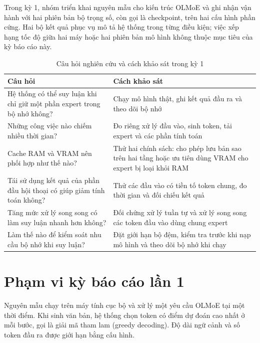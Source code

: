 Trong kỳ 1, nhóm triển khai nguyên mẫu cho kiến trúc OLMoE và ghi nhận vận hành với hai phiên bản bộ trọng số, còn gọi là checkpoint, trên hai cấu hình phần cứng. Hai bộ kết quả phục vụ mô tả hệ thống trong từng điều kiện; việc xếp hạng tốc độ giữa hai máy hoặc hai phiên bản mô hình không thuộc mục tiêu của kỳ báo cáo này.

\begin{table}[htbp]
\centering
\caption{Câu hỏi nghiên cứu và cách khảo sát trong kỳ 1}
\small
\setlength{\tabcolsep}{3pt}
\begin{tabularx}{\textwidth}{>{\RaggedRight\arraybackslash}p{4.5cm} >{\RaggedRight\arraybackslash}X}
\toprule
\textbf{Câu hỏi} & \textbf{Cách khảo sát} \\
\midrule
Hệ thống có thể suy luận khi chỉ giữ một phần expert trong bộ nhớ không? & Chạy mô hình thật, ghi kết quả đầu ra và theo dõi bộ nhớ \\
Những công việc nào chiếm nhiều thời gian? & Đo riêng xử lý đầu vào, sinh token, tải expert và các phần tính toán \\
Cache RAM và VRAM nên phối hợp như thế nào? & Thử hai chính sách: cho phép lưu bản sao trên hai tầng hoặc ưu tiên dùng VRAM cho expert bị loại khỏi RAM \\
Tái sử dụng kết quả của phần đầu hội thoại có giúp giảm tính toán không? & Thử các đầu vào có tiền tố token chung, đo thời gian và đối chiếu kết quả \\
Tăng mức xử lý song song có làm suy luận nhanh hơn không? & Đối chứng xử lý tuần tự và xử lý song song các token đầu vào dùng chung expert \\
Làm thế nào để kiểm soát nhu cầu bộ nhớ khi suy luận? & Đặt giới hạn bộ đệm, kiểm tra trước khi nạp mô hình và theo dõi bộ nhớ khi chạy \\
\bottomrule
\end{tabularx}


\end{table}



\section{Phạm vi kỳ báo cáo lần 1}

Nguyên mẫu chạy trên máy tính cục bộ và xử lý một yêu cầu OLMoE tại một thời điểm. Khi sinh văn bản, hệ thống chọn token có điểm dự đoán cao nhất ở mỗi bước, gọi là giải mã tham lam (greedy decoding). Độ dài ngữ cảnh và số token đầu ra được giới hạn bằng cấu hình.

